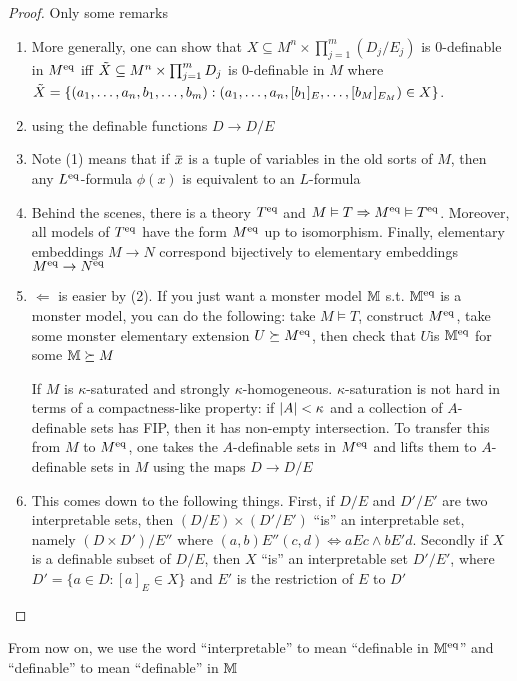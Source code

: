 \documentclass[11pt]{article}
\begin{document}
\begin{proof}
Only some remarks
\begin{enumerate}
\item More generally, one can show that \(X\subseteq  M^n\times\prod_{j=1}^m(D_j/E_j)\) is 0-definable in \(M^{\operatorname{eq}}\)
iff \(\tilde{X}\subseteq M^n\times\prod_{j=1}^mD_j\) is 0-definable in \(M\)
where \(\tilde{X}=\{(a_1,\dots,a_n,b_1,\dots,b_m):(a_1,\dots,a_n,[b_1]_E,\dots,[b_M]_{E_M})\in X\}\).
\setcounter{enumi}{2}
\item using the definable functions \(D\to D/E\)
\item Note (1) means that if \(\barx\) is a tuple of variables in the old sorts of \(M\), then
any \(L^{\operatorname{eq}}\)-formula \(\phi(x)\) is equivalent to an \(L\)-formula
\item Behind the scenes, there is a theory \(T^{\operatorname{eq}}\) and \(M\vDash T\Rightarrow M^{\operatorname{eq}}\vDash T^{\operatorname{eq}}\). Moreover,
all models of \(T^{\operatorname{eq}}\) have the form \(M^{\operatorname{eq}}\) up to isomorphism. Finally, elementary
embeddings \(M\to N\) correspond bijectively to elementary embeddings \(M^{\operatorname{eq}}\to N^{\operatorname{eq}}\)
\setcounter{enumi}{6}
\item \(\Leftarrow\) is easier by (2). If you just want a monster model \(\mathbb{M}\) s.t. \(\mathbb{M}^{\operatorname{eq}}\) is a
monster model, you can do the following: take \(M\vDash T\), construct \(M^{\operatorname{eq}}\), take some
monster elementary extension \(U\succeq M^{\operatorname{eq}}\), then check that \(U\)is \(\mathbb{M}^{\operatorname{eq}}\) for
some \(\mathbb{M}\succeq M\)

If \(M\) is \(\kappa\)-saturated and strongly \(\kappa\)-homogeneous. \(\kappa\)-saturation is not hard in terms of a
compactness-like property: if \(\abs{A}<\kappa\) and a collection of \(A\)-definable sets has FIP,
then it has non-empty intersection. To transfer this from \(M\) to \(M^{\operatorname{eq}}\), one takes
the \(A\)-definable sets in \(M^{\operatorname{eq}}\) and lifts them to \(A\)-definable sets in \(M\) using
the maps \(D\to D/E\)
\setcounter{enumi}{8}
\item This comes down to the following things. First, if \(D/E\) and \(D'/E'\) are two
interpretable sets, then \((D/E)\times(D'/E')\) ``is'' an interpretable set, namely \((D\times D')/E''\)
where \((a,b)E''(c,d)\Leftrightarrow aEc\wedge bE'd\). Secondly if \(X\) is a definable subset of \(D/E\),
then \(X\) ``is'' an interpretable set \(D'/E'\), where \(D'=\{a\in D:[a]_E\in X\}\) and \(E'\) is
the restriction of \(E\) to \(D'\)
\end{enumerate}
\end{proof}

From now on, we use the word ``interpretable'' to mean ``definable in \(\mathbb{M}^{\operatorname{eq}}\)'' and ``definable''
to mean ``definable'' in \(\mathbb{M}\)
\end{document}
